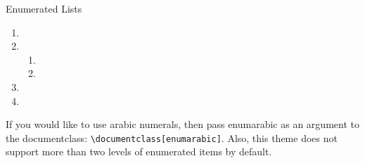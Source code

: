 \documentclass[\string~/GitHub/sthlmNordBeamerTheme/sthlmNordLightDemo.tex]{subfiles}
\begin{document}
\begin{frame}[fragile]{Enumerated Lists}
	\begin{enumerate}
		\item \lipsum[1][1]
		\item \lipsum[1][2]
		      \begin{enumerate}
			      \item \lipsum[2][1]
			      \item \lipsum[2][2]
		      \end{enumerate}
		\item \lipsum[1][3]
		\item \lipsum[1][4]
	\end{enumerate}

	\remarks If you would like to use arabic numerals, then pass
	enumarabic as an argument to the documentclass: \verb+\documentclass[enumarabic]+.
	Also, this theme does not support more than two levels of enumerated items
	by default.

\end{frame}
\end{document}
